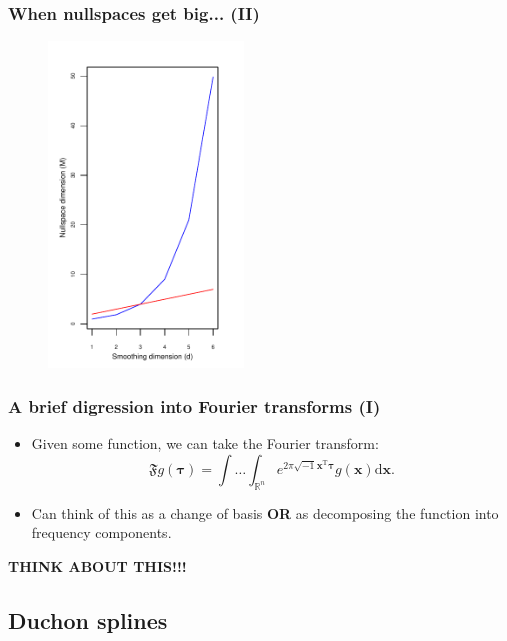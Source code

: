 \documentclass[ignorenonframetext]{beamer} %
\newcommand{\bi}{\begin{itemize}}
\newcommand{\ei}{\end{itemize}}
\begin{document}
\begin{frame}
	\frametitle{When nullspaces get big... (II)}
	\begin{figure}
	\centering
			\includegraphics[height=3.4in]{figs/nullspace-dim.pdf} 
	\end{figure}
\end{frame}

\begin{frame}
	\frametitle{A brief digression into Fourier transforms (I)} 
	\bi
		\item Given some function, we can take the Fourier transform:
		\begin{equation*}
			\mathfrak{F} g(\boldsymbol{\tau}) = \int \ldots \int_{\mathbb{R}^n} e^{2 \pi \sqrt{-1} \mathbf{x}^\text{T} \boldsymbol{\tau}} g(\mathbf{x}) \text{d}\mathbf{x}.
		\end{equation*}
		\item Can think of this as a change of basis \textbf{OR} as decomposing the function into frequency components.	
	\ei
\textbf{THINK ABOUT THIS!!!}
\end{frame}






\subsection{Duchon splines}
\end{document}
